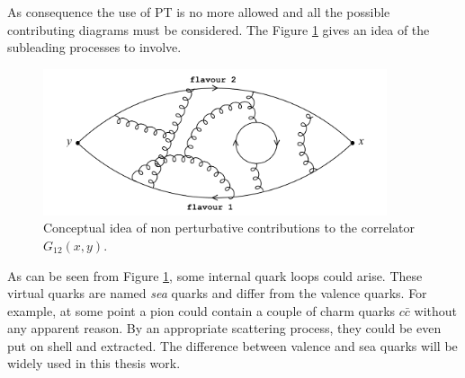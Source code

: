\documentclass[english, LaM, oneside, noexaminfo]{sapthesis}
\begin{document}
As consequence the use of PT is no more allowed and all the possible contributing diagrams must be considered.
The Figure \ref{fig:confinement} gives an idea of the subleading processes to involve.
\begin{figure}[h!]
    \centering
    \includegraphics[width=0.9\textwidth]{imgs-MSc-thesis/confinement.png}
    \caption{Conceptual idea of non perturbative contributions to the correlator $G_{12}(x,y)$.}
    \label{fig:confinement}
\end{figure}
\newline
As can be seen from Figure \ref{fig:confinement}, some internal quark loops could arise.
These virtual quarks are named {\it sea} quarks and differ from the valence quarks.
For example, at some point a pion could contain a couple of charm quarks $c\bar c$ without any apparent reason.
By an appropriate scattering process, they could be even put on shell and extracted.
The difference between valence and sea quarks will be widely used in this thesis work.
\end{document}
